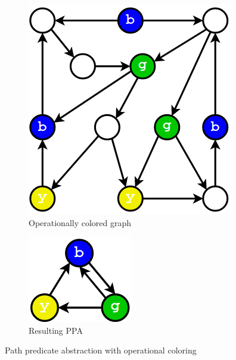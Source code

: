 \begin{figure}[hbt]
 \centering
 \begin{subfigure}[b]{0.4\linewidth}
 \includegraphics[width=\linewidth]{figs/opcoloring.png}
 \caption{Operationally colored graph}
 \end{subfigure}
 \begin{subfigure}[b]{0.3\linewidth}
 \includegraphics[width=\linewidth]{figs/ppa.png}
 \caption{Resulting PPA}
 \end{subfigure}
\caption{Path predicate abstraction with operational coloring}
\label{fig:ppa}
\end{figure}

